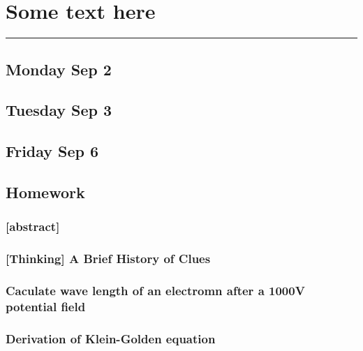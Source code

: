 \section{Some text here}
\vspace{-15pt}\noindent\rule{\textwidth}{0.1pt}\vspace{-10pt}
    \subsection{\hfill \small Monday Sep 2}
    \subsection{\hfill\small Tuesday Sep 3}
    \subsection{\hfill \small Friday Sep 6}
    \subsection*{Homework}
        \subsubsection*{[abstract]}
        \subsubsection{[Thinking] A Brief History of Clues}
        \subsubsection{Caculate wave length of an electromn after a 1000V potential field}
        \subsubsection{Derivation of Klein-Golden equation}